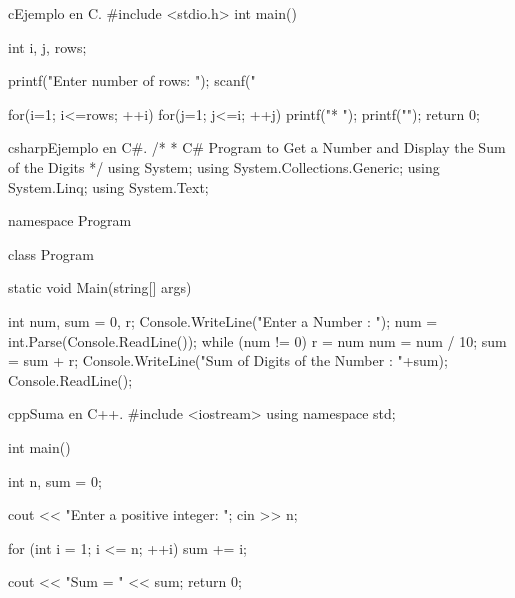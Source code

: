 
\newpage
\begin{sourcecode}[]{c}{Ejemplo en C.}
#include <stdio.h>
int main(){
	int i, j, rows;
	
	printf("Enter number of rows: ");
	scanf("%
	
	for(i=1; i<=rows; ++i){
		for(j=1; j<=i; ++j){
			printf("* ");
		}
		printf("\n");
	}
	return 0;
}
\end{sourcecode}

\begin{sourcecode}[]{csharp}{Ejemplo en C\#.}
/*
* C# Program to Get a Number and Display the Sum of the Digits 
*/
using System;
using System.Collections.Generic;
using System.Linq;
using System.Text;

namespace Program
{
	class Program
	{
		static void Main(string[] args)
		{
			int num, sum = 0, r;
			Console.WriteLine("Enter a Number : ");
			num = int.Parse(Console.ReadLine());
			while (num != 0)
			{
				r = num %
				num = num / 10;
				sum = sum + r;
			}
			Console.WriteLine("Sum of Digits of the Number : "+sum);
			Console.ReadLine();
			
		}
	}
}
\end{sourcecode}

\newpage
\begin{sourcecode}{cpp}{Suma en C++.}
#include <iostream>
using namespace std;

int main()
{
	int n, sum = 0;
	
	cout << "Enter a positive integer: ";
	cin >> n;
	
	for (int i = 1; i <= n; ++i) {
		sum += i;
	}
	
	cout << "Sum = " << sum;
	return 0;
}
\end{sourcecode}

